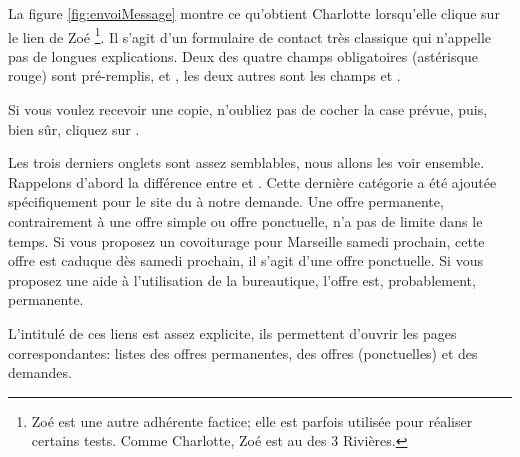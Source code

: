 \label{page:envoyerCourrielMembre}

La figure \ref{fig:envoiMessage}  montre ce qu’obtient Charlotte lorsqu’elle clique sur le lien  de Zoé%
\footnote{Zoé est une autre adhérente factice; elle est parfois utilisée pour réaliser certains tests. Comme Charlotte, Zoé est  au \sel{} des 3 Rivières.}.
Il s’agit d’un formulaire de contact très classique qui n’appelle pas de longues explications. Deux des quatre champs obligatoires (astérisque rouge) sont pré-remplis,  et , les deux autres sont les champs  et .

Si vous voulez recevoir une copie, n'oubliez pas de cocher la case prévue, puis, bien sûr, cliquez sur .
 


Les trois derniers onglets sont assez semblables, nous allons les voir ensemble.
\label{page:typesOffres}Rappelons d’abord la différence entre  et . Cette dernière catégorie a été ajoutée spécifiquement pour le site du \CdS{} à notre demande. Une offre permanente, contrairement à une offre simple ou offre ponctuelle, n’a pas de limite dans le temps. Si vous proposez un covoiturage pour Marseille samedi prochain, cette offre est caduque dès samedi prochain, il s’agit d’une offre ponctuelle. Si vous proposez une aide à l’utilisation de la bureautique, l’offre est, probablement, permanente.

L'intitulé de ces liens est assez explicite, ils permettent d’ouvrir les pages correspondantes: listes des offres permanentes, des offres (ponctuelles) et des demandes. 


